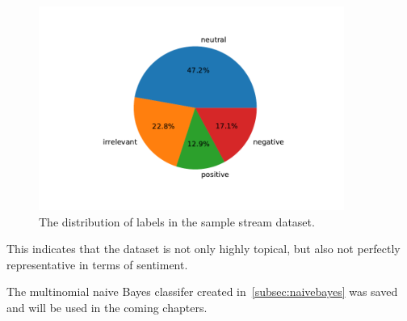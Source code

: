 \begin{figure}
    \centering
    \caption{The distribution of labels in the sample stream dataset.}
    \label{fig:sample_sentiment}
    \includegraphics[width=10cm]{../figures/sample_sentiment.pdf}
\end{figure}

This indicates that the dataset is not only highly topical, but also not perfectly representative in terms of sentiment.

\par
The multinomial naive Bayes classifer created in~\ref{subsec:naivebayes} was saved and will be used in the coming chapters.
